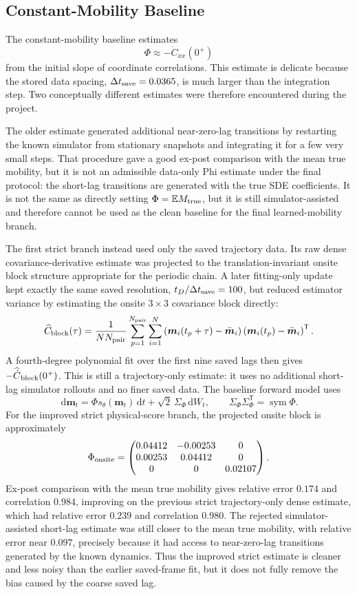 \documentclass[11pt]{article}
\newcommand{\dd}{\,\mathrm{d}}
\newcommand{\E}{\mathbb{E}}
\newcommand{\T}{\mathsf{T}}
\begin{document}
\subsection{Constant-Mobility Baseline}

The constant-mobility baseline estimates
\[
  \Phi \approx -\dot C_{xx}(0^+)
\]
from the initial slope of coordinate correlations.  This estimate is delicate
because the stored data spacing, $\Delta t_{\rm save}=0.0365$, is much larger
than the integration step.  Two conceptually different estimates were therefore
encountered during the project.

The older estimate generated additional near-zero-lag transitions by restarting
the known simulator from stationary snapshots and integrating it for a few very
small steps.  That procedure gave a good ex-post comparison with the mean true
mobility, but it is not an admissible data-only Phi estimate under the final
protocol: the short-lag transitions are generated with the true SDE
coefficients.  It is not the same as directly setting $\Phi=\E M_{\rm true}$,
but it is still simulator-assisted and therefore cannot be used as the clean
baseline for the final learned-mobility branch.

The first strict branch instead used only the saved trajectory data.  Its raw
dense covariance-derivative estimate was projected to the translation-invariant
onsite block structure appropriate for the periodic chain.  A later
fitting-only update kept exactly the same saved resolution,
$t_D/\Delta t_{\rm save}=100$, but reduced estimator variance by estimating the
onsite $3\times3$ covariance block directly:
\[
  \widehat C_{\rm block}(\tau)
  =
  \frac{1}{N N_{\rm pair}}
  \sum_{p=1}^{N_{\rm pair}}\sum_{i=1}^{N}
  \left(\bm m_i(t_p+\tau)-\bar{\bm m}_i\right)
  \left(\bm m_i(t_p)-\bar{\bm m}_i\right)^\T .
\]
A fourth-degree polynomial fit over the first nine saved lags then gives
$-\widehat{\dot C}_{\rm block}(0^+)$.  This is still a trajectory-only
estimate: it uses no additional short-lag simulator rollouts and no finer
saved data.  The baseline forward model uses
\[
  \dd \bm m_t=\Phi s_\theta(\bm m_t)\dd t
  +\sqrt{2}\,\Sigma_\Phi\dd W_t,\qquad
  \Sigma_\Phi\Sigma_\Phi^\T=\operatorname{sym}\Phi .
\]
For the improved strict physical-score branch, the projected onsite block is
approximately
\[
  \Phi_{\rm onsite}
  =
  \begin{pmatrix}
    0.04412 & -0.00253 & 0 \\
    0.00253 & 0.04412 & 0 \\
    0 & 0 & 0.02107
  \end{pmatrix}.
\]
Ex-post comparison with the mean true mobility gives relative error $0.174$ and
correlation $0.984$, improving on the previous strict trajectory-only dense
estimate, which had relative error $0.239$ and correlation $0.980$.  The
rejected simulator-assisted short-lag estimate was still closer to the mean true
mobility, with relative error near $0.097$, precisely because it had access to
near-zero-lag transitions generated by the known dynamics.  Thus the improved
strict estimate is cleaner and less noisy than the earlier saved-frame fit, but
it does not fully remove the bias caused by the coarse saved lag.
\end{document}
